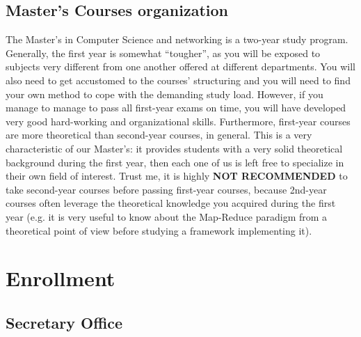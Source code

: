 \documentclass[11pt,fleqn,oneside]{book} %
\begin{document}

\section{Master’s Courses organization}

The Master’s in Computer Science and networking is a two-year study program. Generally, the first year is somewhat “tougher”, as you will be exposed to subjects very different from one another offered at different departments. You will also need to get accustomed  to the courses’ structuring and you will need to find your own method to cope with the demanding study load. However, if you manage to manage to pass all first-year exams on time, you will have developed very good hard-working and organizational skills. Furthermore, first-year courses are more theoretical than second-year courses, in general.  This is a very characteristic of our Master’s: it provides students with a very solid theoretical background during the first year, then each one of us is left free to specialize in their own field of interest. 
Trust me, it is highly \textbf{NOT RECOMMENDED} to take second-year courses before passing first-year courses, because 2nd-year courses often leverage the theoretical knowledge you acquired during the first year (e.g. it is very useful to know about the Map-Reduce paradigm from a theoretical point of view before studying a framework implementing it). 



\chapter{Enrollment}


\section{Secretary Office}
\end{document}
